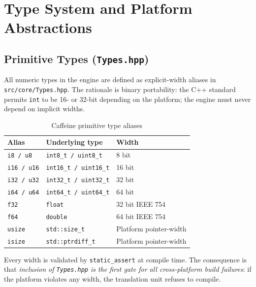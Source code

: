 \chapter{Type System and Platform Abstractions}

\section{Primitive Types (\texttt{Types.hpp})}

All numeric types in the engine are defined as explicit-width aliases in
\texttt{src/core/Types.hpp}. The rationale is binary portability: the C++
standard permits \texttt{int} to be 16- or 32-bit depending on the platform;
the engine must never depend on implicit widths.

\begin{table}[H]
\centering
\caption{Caffeine primitive type aliases}
\begin{tabular}{lll}
\toprule
\textbf{Alias} & \textbf{Underlying type} & \textbf{Width} \\
\midrule
\texttt{i8 / u8}   & \texttt{int8\_t / uint8\_t}   & 8 bit  \\
\texttt{i16 / u16} & \texttt{int16\_t / uint16\_t} & 16 bit \\
\texttt{i32 / u32} & \texttt{int32\_t / uint32\_t} & 32 bit \\
\texttt{i64 / u64} & \texttt{int64\_t / uint64\_t} & 64 bit \\
\texttt{f32}       & \texttt{float}                & 32 bit IEEE 754 \\
\texttt{f64}       & \texttt{double}               & 64 bit IEEE 754 \\
\texttt{usize}     & \texttt{std::size\_t}         & Platform pointer-width \\
\texttt{isize}     & \texttt{std::ptrdiff\_t}      & Platform pointer-width \\
\bottomrule
\end{tabular}
\end{table}

Every width is validated by \texttt{static\_assert} at compile time.
The consequence is that \emph{inclusion of \texttt{Types.hpp} is the first
gate for all cross-platform build failures}: if the platform violates any
width, the translation unit refuses to compile.

